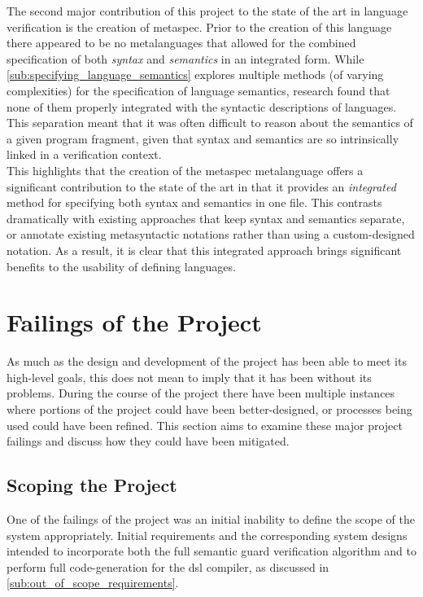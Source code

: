 The second major contribution of this project to the state of the art in language verification is the creation of \gls{metaspec}. 
Prior to the creation of this language there appeared to be no metalanguages that allowed for the combined specification of both \textit{syntax} and \textit{semantics} in an integrated form. 
While \autoref{sub:specifying_language_semantics} explores multiple methods (of varying complexities) for the specification of language semantics, research found that none of them properly integrated with the syntactic descriptions of languages.
This separation meant that it was often difficult to reason about the semantics of a given program fragment, given that syntax and semantics are so intrinsically linked in a verification context.\\

This highlights that the creation of the \gls{metaspec} metalanguage offers a significant contribution to the state of the art in that it provides an \textit{integrated} method for specifying both syntax and semantics in one file.
This contrasts dramatically with existing approaches that keep syntax and semantics separate, or annotate existing metasyntactic notations rather than using a custom-designed notation.
As a result, it is clear that this integrated approach brings significant benefits to the usability of defining languages.



\section{Failings of the Project} %
\label{sec:failings_of_the_project}
As much as the design and development of the project has been able to meet its high-level goals, this does not mean to imply that it has been without its problems. 
During the course of the project there have been multiple instances where portions of the project could have been better-designed, or processes being used could have been refined. 
This section aims to examine these major project failings and discuss how they could have been mitigated. 

\subsection{Scoping the Project} %
\label{sub:scoping_the_project}
One of the failings of the project was an initial inability to define the scope of the system appropriately.
Initial requirements and the corresponding system designs intended to incorporate both the full semantic guard verification algorithm and to perform full code-generation for the \gls{dsl} compiler, as discussed in \autoref{sub:out_of_scope_requirements}. \\


